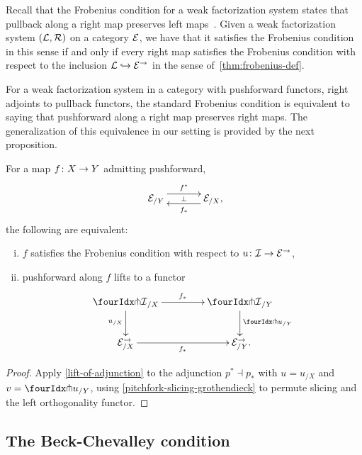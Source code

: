 \documentclass[reqno,10pt,a4paper,oneside,draft]{amsart}
\begin{document}
\begin{remark} Recall that the Frobenius condition for a weak factorization system states that pullback along a right map preserves left maps~\cite{garner:types-omega-groupoids,gambino-garner:idtypewfs}. Given a weak factorization system $(\cal{L}, \cal{R})$ on a category $\catE$, we have that it satisfies the Frobenius condition  in this sense if and only if every right map satisfies the Frobenius condition with respect to the inclusion $\cal{L} \hookrightarrow \catE^\to$
in the sense of~\cref{thm:frobenius-def}.
\end{remark} 


For a weak factorization system in a category with pushforward functors, \ie right adjoints to pullback functors, the standard Frobenius condition is equivalent to saying that pushforward along a right map preserves right maps.
The generalization of this equivalence in our setting is provided by the next proposition.

\begin{proposition} \label{lift-pushforward}
For a map $f \co X \to Y$ admitting pushforward,
\[
\xymatrix@C+1em{
  \catE_{/Y}
  \ar@<5pt>[r]^{f^*}
  \ar@{}[r]|{\bot}
&
  \catE_{/X}
  \ar@<5pt>[l]^{f_*}
\rlap{,}}
\]
the following are equivalent:
\begin{enumerate}[(i)]
\item $f$ satisfies the Frobenius condition with respect to $u \co \cal{I} \to \cal{E}^\to$, 
\item pushforward along $f$ lifts to a functor
\[
\xymatrix@C=1.5cm{
  {\liftr{\cal{I}}}_{/X}
  \ar[r]^{f_*}
  \ar[d]_{u_{/X}}
&
  {\liftr{\cal{I}}}_{/Y}
  \ar[d]^{{\liftr{u}}_{/Y}}
\\
  \catE_{/X}^\to
  \ar[r]_{f_*}
&
  \catE_{/Y}^\to
\rlap{.}}
\]

\end{enumerate}
\end{proposition}

\begin{proof}
Apply \cref{lift-of-adjunction} to the adjunction $p^* \dashv p_*$ with $u = u_{/X}$ and $v = {\liftr{u}}_{/Y}$, using \cref{pitchfork-slicing-grothendieck} to permute slicing and the left orthogonality functor.
\end{proof}

\subsection*{The Beck-Chevalley condition}
\end{document}
